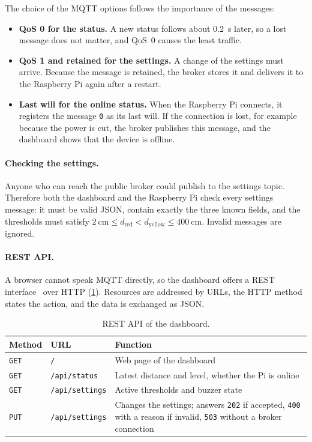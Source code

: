 \documentclass[11pt,a4paper]{article}
\begin{document}
The choice of the MQTT options follows the importance of the messages:
\begin{itemize}
  \item \textbf{QoS 0 for the status.} A new status follows about
        \qty{0.2}{\second} later, so a lost message does not matter, and QoS~0
        causes the least traffic.
  \item \textbf{QoS 1 and retained for the settings.} A change of the settings
        must arrive. Because the message is retained, the broker stores it and
        delivers it to the Raspberry Pi again after a restart.
  \item \textbf{Last will for the online status.} When the Raspberry Pi
        connects, it registers the message \texttt{0} as its last will. If the
        connection is lost, for example because the power is cut, the broker
        publishes this message, and the dashboard shows that the device is
        offline.
\end{itemize}

\paragraph{Checking the settings.} Anyone who can reach the public broker could
publish to the settings topic. Therefore both the dashboard and the Raspberry Pi
check every settings message: it must be valid JSON, contain exactly the three
known fields, and the thresholds must satisfy
$\qty{2}{\centi\metre} \le d_\text{red} < d_\text{yellow} \le \qty{400}{\centi\metre}$.
Invalid messages are ignored.

\paragraph{REST API.} A browser cannot speak MQTT directly, so the dashboard
offers a REST interface~\cite{fielding2000rest} over HTTP (\cref{tab:rest}).
Resources are addressed by URLs, the HTTP method states the action, and the data
is exchanged as JSON.

\begin{table}[htbp]
  \centering
  \caption{REST API of the dashboard.}
  \label{tab:rest}
  \begin{tabularx}{\textwidth}{@{}l l X@{}}
    \toprule
    Method & URL & Function \\
    \midrule
    \texttt{GET} & \texttt{/}              & Web page of the dashboard \\
    \texttt{GET} & \texttt{/api/status}    & Latest distance and level, whether the Pi is online \\
    \texttt{GET} & \texttt{/api/settings}  & Active thresholds and buzzer state \\
    \texttt{PUT} & \texttt{/api/settings}  & Changes the settings; answers \texttt{202} if accepted, \texttt{400} with a reason if invalid, \texttt{503} without a broker connection \\
    \bottomrule
  \end{tabularx}
\end{table}
\end{document}
